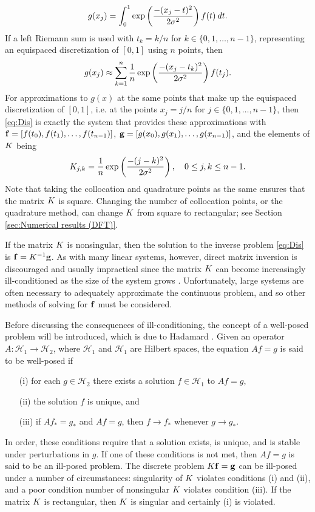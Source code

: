 \[g(x_j) = \int_0^1 \exp\left(\frac{-(x_j - t)^2}{2\sigma^2}\right)f(t) \: dt.\]
If a left Riemann sum is used with $t_k = k/n$ for $k \in \{0,1,\ldots,n-1\}$, representing an equispaced discretization of $[0,1]$ using $n$ points, then
\[g(x_j) \approx \sum_{k=1}^n \frac{1}{n}\exp\left(\frac{-(x_j - t_k)^2}{2\sigma^2}\right)f(t_j).\]
For approximations to $g(x)$ at the same points that make up the equispaced discretization of $[0,1]$, i.e. at the points $x_j = j/n$ for $j \in \{0,1,\ldots,n-1\}$, then \eqref{eq:Dis} is exactly the system that provides these approximations with $\mathbf{f} = [f(t_0),f(t_1),\ldots,f(t_{n-1})]$, $\mathbf{g} = [g(x_0),g(x_1),\ldots,g(x_{n-1})]$, and the elements of $K$ being
\[K_{j,k} = \frac{1}{n}\exp\left(\frac{-(j - k)^2}{2\sigma^2}\right), \quad 0 \leq j,k \leq n-1.\]
Note that taking the collocation and quadrature points as the same ensures that the matrix $K$ is square. Changing the number of collocation points, or the quadrature method, can change $K$ from square to rectangular; see Section \ref{sec:Numerical results (DFT)}. \par
If the matrix $K$ is nonsingular, then the solution to the inverse problem \eqref{eq:Dis} is $\mathbf{f} = K^{-1}\mathbf{g}$. As with many linear systems, however, direct matrix inversion is discouraged and usually impractical since the matrix $K$ can become increasingly ill-conditioned as the size of the system grows \cite[p.~2]{Vogel:2002}. Unfortunately, large systems are often necessary to adequately approximate the continuous problem, and so other methods of solving for $\mathbf{f}$ must be considered. \par
Before discussing the consequences of ill-conditioning, the concept of a well-posed problem will be introduced, which is due to Hadamard \cite{Hadamard1904}. Given an operator $A : \mathcal{H}_1 \rightarrow \mathcal{H}_2$, where $\mathcal{H}_1$ and $\mathcal{H}_1$ are Hilbert spaces, the equation $Af = g$ is said to be well-posed if
\begin{enumerate}
\item[(i)] for each $g \in \mathcal{H}_2$ there exists a solution $f \in \mathcal{H}_1$ to $Af = g$,
\item[(ii)] the solution $f$ is unique, and
\item[(iii)] if $Af_* = g_*$ and $Af = g$, then $f \rightarrow f_*$ whenever $g \rightarrow g_*$.
\end{enumerate}
In order, these conditions require that a solution exists, is unique, and is stable under perturbations in $g$. If one of these conditions is not met, then $Af = g$ is said to be an ill-posed problem. The discrete problem $K\mathbf{f} = \mathbf{g}$ can be ill-posed under a number of circumstances: singularity of $K$ violates conditions (i) and (ii), and a poor condition number of nonsingular $K$ violates condition (iii). If the matrix $K$ is rectangular, then $K$ is singular and certainly (i) is violated.  \par 
